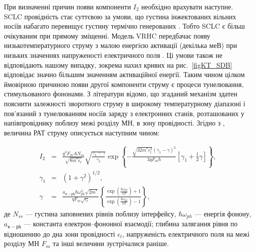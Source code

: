 При визначенні причин появи компоненти $I_2$ необхідно врахувати наступне.
SCLC провідність стає суттєвою за умови, що густина інжектованих вільних носіїв
набагато перевищує густину термічно генерованих \cite{Jafar}.
Тобто SCLC є більш очікуваним при прямому зміщенні.
Модель VRHC передбачає появу низькотемпературного струму з малою енергією активації (декілька меВ) при
низьких значеннях напруженості електричного поля \cite{Jafar}.
Ці умови також не відповідають нашому випадку, зокрема нахил кривих на рис.~\ref{figKT_SDB} відповідає значно більшим значенням
активаційної енергії.
Таким чином цілком ймовірною причиною появи другої компоненти струму є процеси тунелювання, стимульованого фононами.
З літератури \cite{Pipinys1999,Pipinys2006,PipinsFTP} відомо, що згаданий механізм здатен пояснити залежності
зворотного струму в широкому температурному діапазоні і пов'язаний з тунелюванням
 носіїв заряду з електронних станів, розташованих у напівпровіднику поблизу межі розділу МН, в зону провідності.
Згідно з \cite{Pipinys2006,Kiveris}, величина РАТ струму описується наступним чином:

\begin{eqnarray}
\label{eqIpat}
 I_{2}&=&\frac{q^2F_mAN_{ss}}{\sqrt{8m^*\epsilon_t}}\sqrt{\frac{\gamma_1-\gamma}{\gamma_1}}\exp
    \left\{-\frac{\sqrt{32m^*\epsilon_t^3}\left(\gamma_1-\gamma\right)^2}{3qF_m\hbar}
    [\gamma_1+\frac{1}{2}\gamma]\right\}, \\
    \gamma_1&=&(1+\gamma^2)^{1/2},\\
\label{eqIpat3}
    \gamma&=&\frac{a_\mathtt{e-ph}\hbar\omega_{ph}^2\sqrt{2m^*}}{qF_m\sqrt{\epsilon_t}}
    \left\{\frac{\exp\left(\frac{\hbar\omega_{ph}}{kT}\right)+1}{\exp\left(\frac{\hbar\omega_{ph}}{kT}\right)-1}\right\},
\end{eqnarray}
де
$N_{ss}$ --- густина заповнених рівнів поблизу інтерфейсу,
$\hbar\omega_{ph}$ --- енергія фонону,
$a_\mathtt{e-ph}$ --- константа електрон--фононної взаємодії;
глибина залягання рівня по відношенню до дна зони провідності $\epsilon_t$,
напруженість електричного поля на межі розділу МН $F_m$ та інші величини зустрічалися раніше.

